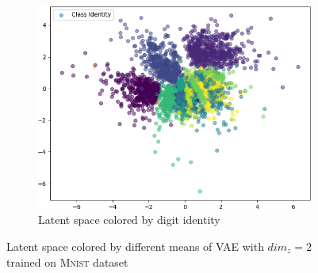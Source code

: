 \begin{figure}
\begin{subfigure}{.24\textwidth}
        \includegraphics[width=\textwidth]{images/latent_spaces/mnist/vae/embeddings_mu_6.png}
        \caption{Latent space colored by digit identity}
        \label{subfig:vae_mnist_latent_space_identity}
    \end{subfigure}
    \caption[\ac{VAE} Latent Space on \textsc{Mnist}]{Latent space colored by different means of \ac{VAE} with $dim_z=2$ trained on \textsc{Mnist} dataset}
    \label{fig:vae_latent_space_mnist}
\end{figure}

